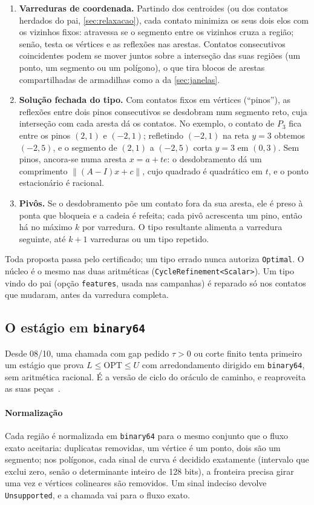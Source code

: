 \documentclass[11pt,a4paper]{article}
\theoremstyle{plain}\newtheorem{proposicao}{Proposição}
\theoremstyle{definition}\newtheorem{definicao}{Definição}
\theoremstyle{plain}\newtheorem{teorema}{Teorema}
\theoremstyle{plain}\newtheorem{lema}{Lema}
\newcommand{\norm}[1]{\lVert#1\rVert}
\newcommand{\OPT}{\mathrm{OPT}}
\newcommand{\code}[1]{\texttt{\small #1}}
\begin{document}
\begin{enumerate}[leftmargin=*,itemsep=2pt]
\item \textbf{Varreduras de coordenada.} Partindo dos centroides (ou dos contatos herdados do pai, \cref{sec:relaxacao}), cada contato minimiza os seus dois elos com os vizinhos fixos: atravessa se o segmento entre os vizinhos cruza a região; senão, testa os vértices e as reflexões nas arestas. Contatos consecutivos coincidentes podem se mover juntos sobre a interseção das suas regiões (um ponto, um segmento ou um polígono), o que tira blocos de arestas compartilhadas de armadilhas como a da \cref{sec:janelas}.
\item \textbf{Solução fechada do tipo.} Com contatos fixos em vértices (``pinos''), as reflexões entre dois pinos consecutivos se desdobram num segmento reto, cuja interseção com cada aresta dá os contatos. No exemplo, o contato de \(P_3\) fica entre os pinos \((2,1)\) e \((-2,1)\); refletindo \((-2,1)\) na reta \(y=3\) obtemos \((-2,5)\), e o segmento de \((2,1)\) a \((-2,5)\) corta \(y=3\) em \((0,3)\). Sem pinos, ancora-se numa aresta \(x=a+te\): o desdobramento dá um comprimento \(\norm{(A-I)x+c}\), cujo quadrado é quadrático em \(t\), e o ponto estacionário é racional.
\item \textbf{Pivôs.} Se o desdobramento põe um contato fora da sua aresta, ele é preso à ponta que bloqueia e a cadeia é refeita; cada pivô acrescenta um pino, então há no máximo \(k\) por varredura. O tipo resultante alimenta a varredura seguinte, até \(k+1\) varreduras ou um tipo repetido.
\end{enumerate}
Toda proposta passa pelo certificado; um tipo errado nunca autoriza \code{Optimal}. O núcleo é o mesmo nas duas aritméticas (\code{CycleRefinement<Scalar>}). Um tipo vindo do pai (opção \code{features}, usada nas campanhas) é reparado só nos contatos que mudaram, antes da varredura completa.

\subsection{O estágio em \texttt{binary64}}\label{sec:binary64}
Desde 08/10, uma chamada com gap pedido \(\tau>0\) ou corte finito tenta primeiro um estágio que prova \(L\le\OPT\le U\) com arredondamento dirigido em \texttt{binary64}, sem aritmética racional. É a versão de ciclo do oráculo de caminho, e reaproveita as suas peças~\cite{oraculo}.

\paragraph{Normalização} Cada região é normalizada em \texttt{binary64} para o mesmo conjunto que o fluxo exato aceitaria: duplicatas removidas, um vértice é um ponto, dois são um segmento; nos polígonos, cada sinal de curva é decidido exatamente (intervalo que exclui zero, senão o determinante inteiro de 128 bits), a fronteira precisa girar uma vez e vértices colineares são removidos. Um sinal indeciso devolve \code{Unsupported}, e a chamada vai para o fluxo exato.
\end{document}
